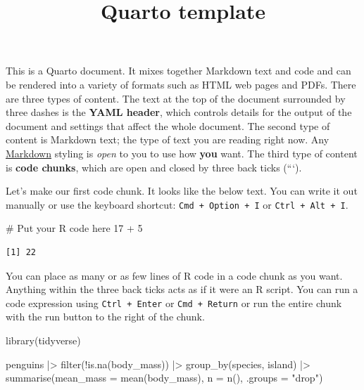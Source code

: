 \documentclass[
  letterpaper,
  DIV=11,
  numbers=noendperiod]{scrartcl}
\title{Quarto template}
\author{}
\date{}
\newenvironment{Shaded}{\begin{snugshade}}{\end{snugshade}}
\newcommand{\AttributeTok}[1]{\textcolor[rgb]{0.40,0.45,0.13}{#1}}
\newcommand{\CommentTok}[1]{\textcolor[rgb]{0.37,0.37,0.37}{#1}}
\newcommand{\DecValTok}[1]{\textcolor[rgb]{0.68,0.00,0.00}{#1}}
\newcommand{\FunctionTok}[1]{\textcolor[rgb]{0.28,0.35,0.67}{#1}}
\newcommand{\NormalTok}[1]{\textcolor[rgb]{0.00,0.23,0.31}{#1}}
\newcommand{\SpecialCharTok}[1]{\textcolor[rgb]{0.37,0.37,0.37}{#1}}
\newcommand{\StringTok}[1]{\textcolor[rgb]{0.13,0.47,0.30}{#1}}
\begin{document}
\maketitle


This is a Quarto document. It mixes together Markdown text and code and
can be rendered into a variety of formats such as HTML web pages and
PDFs. There are three types of content. The text at the top of the
document surrounded by three dashes is the \textbf{YAML header}, which
controls details for the output of the document and settings that affect
the whole document. The second type of content is Markdown text; the
type of text you are reading right now. Any
\href{https://quarto.org/docs/authoring/markdown-basics.html}{Markdown}
styling is \emph{open} to you to use how \textbf{you} want. The third
type of content is \textbf{code chunks}, which are open and closed by
three back ticks (```).

Let's make our first code chunk. It looks like the below text. You can
write it out manually or use the keyboard shortcut:
\texttt{Cmd\ +\ Option\ +\ I} or \texttt{Ctrl\ +\ Alt\ +\ I}.

\begin{Shaded}
\begin{Highlighting}[]
\CommentTok{\# Put your R code here}
\DecValTok{17} \SpecialCharTok{+} \DecValTok{5}
\end{Highlighting}
\end{Shaded}

\begin{verbatim}
[1] 22
\end{verbatim}

You can place as many or as few lines of R code in a code chunk as you
want. Anything within the three back ticks acts as if it were an R
script. You can run a code expression using \texttt{Ctrl\ +\ Enter} or
\texttt{Cmd\ +\ Return} or run the entire chunk with the run button to
the right of the chunk.

\begin{Shaded}
\begin{Highlighting}[]
\FunctionTok{library}\NormalTok{(tidyverse)}

\NormalTok{penguins }\SpecialCharTok{|\textgreater{}}
  \FunctionTok{filter}\NormalTok{(}\SpecialCharTok{!}\FunctionTok{is.na}\NormalTok{(body\_mass)) }\SpecialCharTok{|\textgreater{}} 
  \FunctionTok{group\_by}\NormalTok{(species, island) }\SpecialCharTok{|\textgreater{}}
  \FunctionTok{summarise}\NormalTok{(}\AttributeTok{mean\_mass =} \FunctionTok{mean}\NormalTok{(body\_mass),}
            \AttributeTok{n =} \FunctionTok{n}\NormalTok{(),}
            \AttributeTok{.groups =} \StringTok{"drop"}\NormalTok{)}
\end{Highlighting}
\end{Shaded}
\end{document}
